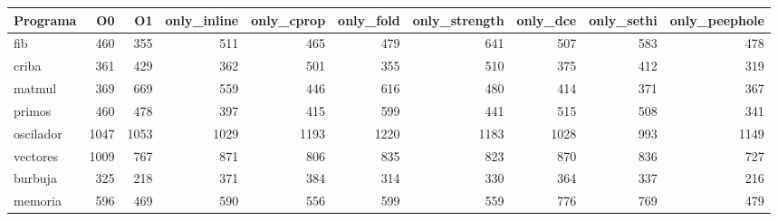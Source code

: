 \begin{tabular}{lrrrrrrrrr}\toprule
Programa & O0 & O1 & only\_inline & only\_cprop & only\_fold & only\_strength & only\_dce & only\_sethi & only\_peephole \\\midrule
fib & 460 & 355 & 511 & 465 & 479 & 641 & 507 & 583 & 478 \\
criba & 361 & 429 & 362 & 501 & 355 & 510 & 375 & 412 & 319 \\
matmul & 369 & 669 & 559 & 446 & 616 & 480 & 414 & 371 & 367 \\
primos & 460 & 478 & 397 & 415 & 599 & 441 & 515 & 508 & 341 \\
oscilador & 1047 & 1053 & 1029 & 1193 & 1220 & 1183 & 1028 & 993 & 1149 \\
vectores & 1009 & 767 & 871 & 806 & 835 & 823 & 870 & 836 & 727 \\
burbuja & 325 & 218 & 371 & 384 & 314 & 330 & 364 & 337 & 216 \\
memoria & 596 & 469 & 590 & 556 & 599 & 559 & 776 & 769 & 479 \\
\bottomrule\end{tabular}
